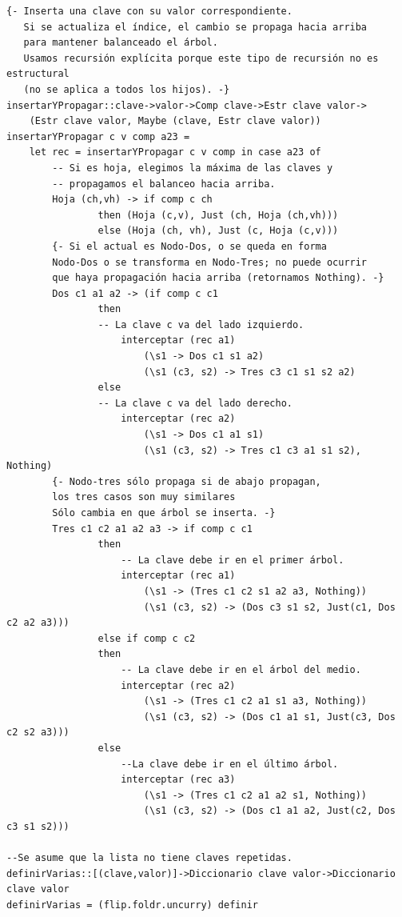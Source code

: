 \documentclass[a4paper]{article}
\begin{document}
\begin{verbatim}
{- Inserta una clave con su valor correspondiente.
   Si se actualiza el índice, el cambio se propaga hacia arriba
   para mantener balanceado el árbol.
   Usamos recursión explícita porque este tipo de recursión no es estructural
   (no se aplica a todos los hijos). -}
insertarYPropagar::clave->valor->Comp clave->Estr clave valor->
    (Estr clave valor, Maybe (clave, Estr clave valor))
insertarYPropagar c v comp a23 =
    let rec = insertarYPropagar c v comp in case a23 of
        -- Si es hoja, elegimos la máxima de las claves y
        -- propagamos el balanceo hacia arriba.
        Hoja (ch,vh) -> if comp c ch
                then (Hoja (c,v), Just (ch, Hoja (ch,vh)))
                else (Hoja (ch, vh), Just (c, Hoja (c,v)))
        {- Si el actual es Nodo-Dos, o se queda en forma
        Nodo-Dos o se transforma en Nodo-Tres; no puede ocurrir
        que haya propagación hacia arriba (retornamos Nothing). -}
        Dos c1 a1 a2 -> (if comp c c1
                then
                -- La clave c va del lado izquierdo.
                    interceptar (rec a1)
                        (\s1 -> Dos c1 s1 a2)
                        (\s1 (c3, s2) -> Tres c3 c1 s1 s2 a2)
                else
                -- La clave c va del lado derecho.
                    interceptar (rec a2)
                        (\s1 -> Dos c1 a1 s1)
                        (\s1 (c3, s2) -> Tres c1 c3 a1 s1 s2), Nothing)
        {- Nodo-tres sólo propaga si de abajo propagan,
        los tres casos son muy similares
        Sólo cambia en que árbol se inserta. -}
        Tres c1 c2 a1 a2 a3 -> if comp c c1
                then
                    -- La clave debe ir en el primer árbol.
                    interceptar (rec a1)
                        (\s1 -> (Tres c1 c2 s1 a2 a3, Nothing))
                        (\s1 (c3, s2) -> (Dos c3 s1 s2, Just(c1, Dos c2 a2 a3)))
                else if comp c c2
                then
                    -- La clave debe ir en el árbol del medio.
                    interceptar (rec a2)
                        (\s1 -> (Tres c1 c2 a1 s1 a3, Nothing))
                        (\s1 (c3, s2) -> (Dos c1 a1 s1, Just(c3, Dos c2 s2 a3)))
                else
                    --La clave debe ir en el último árbol.
                    interceptar (rec a3)
                        (\s1 -> (Tres c1 c2 a1 a2 s1, Nothing))
                        (\s1 (c3, s2) -> (Dos c1 a1 a2, Just(c2, Dos c3 s1 s2)))

--Se asume que la lista no tiene claves repetidas.
definirVarias::[(clave,valor)]->Diccionario clave valor->Diccionario clave valor
definirVarias = (flip.foldr.uncurry) definir


\end{verbatim}
\end{document}
